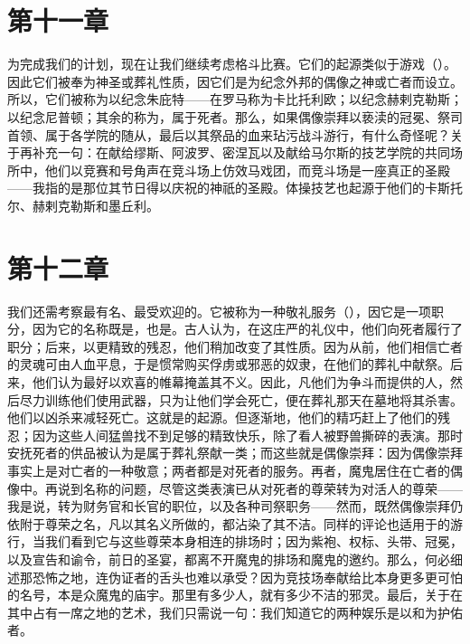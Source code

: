 \section{第十一章}

为完成我们的计划，现在让我们继续考虑格斗比赛。它们的起源类似于游戏（）。因此它们被奉为神圣或葬礼性质，因它们是为纪念外邦的偶像之神或亡者而设立。所以，它们被称为以纪念朱庇特——在罗马称为卡比托利欧；以纪念赫剌克勒斯；以纪念尼普顿；其余的称为，属于死者。那么，如果偶像崇拜以亵渎的冠冕、祭司首领、属于各学院的随从，最后以其祭品的血来玷污战斗游行，有什么奇怪呢？关于再补充一句：在献给缪斯、阿波罗、密涅瓦以及献给马尔斯的技艺学院的共同场所中，他们以竞赛和号角声在竞斗场上仿效马戏团，而竞斗场是一座真正的圣殿——我指的是那位其节日得以庆祝的神祇的圣殿。体操技艺也起源于他们的卡斯托尔、赫剌克勒斯和墨丘利。\par


\section{第十二章}

我们还需考察最有名、最受欢迎的。它被称为一种敬礼服务（），因它是一项职分，因为它的名称既是，也是。古人认为，在这庄严的礼仪中，他们向死者履行了职分；后来，以更精致的残忍，他们稍加改变了其性质。因为从前，他们相信亡者的灵魂可由人血平息，于是惯常购买俘虏或邪恶的奴隶，在他们的葬礼中献祭。后来，他们认为最好以欢喜的帷幕掩盖其不义。因此，凡他们为争斗而提供的人，然后尽力训练他们使用武器，只为让他们学会死亡，便在葬礼那天在墓地将其杀害。他们以凶杀来减轻死亡。这就是的起源。但逐渐地，他们的精巧赶上了他们的残忍；因为这些人间猛兽找不到足够的精致快乐，除了看人被野兽撕碎的表演。那时安抚死者的供品被认为是属于葬礼祭献一类；而这些就是偶像崇拜：因为偶像崇拜事实上是对亡者的一种敬意；两者都是对死者的服务。再者，魔鬼居住在亡者的偶像中。再说到名称的问题，尽管这类表演已从对死者的尊荣转为对活人的尊荣——我是说，转为财务官和长官的职位，以及各种司祭职务——然而，既然偶像崇拜仍依附于尊荣之名，凡以其名义所做的，都沾染了其不洁。同样的评论也适用于的游行，当我们看到它与这些尊荣本身相连的排场时；因为紫袍、权标、头带、冠冕，以及宣告和谕令，前日的圣宴，都离不开魔鬼的排场和魔鬼的邀约。那么，何必细述那恐怖之地，连伪证者的舌头也难以承受？因为竞技场奉献给比本身更多更可怕的名号，本是众魔鬼的庙宇。那里有多少人，就有多少不洁的邪灵。最后，关于在其中占有一席之地的艺术，我们只需说一句：我们知道它的两种娱乐是以和为护佑者。\par

